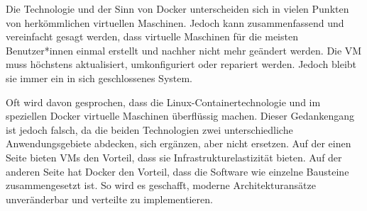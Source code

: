 
Die Technologie und der Sinn von Docker unterscheiden sich in vielen Punkten von herkömmlichen virtuellen Maschinen. Jedoch kann zusammenfassend und vereinfacht gesagt werden, dass virtuelle Maschinen für die meisten Benutzer*innen einmal erstellt und nachher nicht mehr geändert werden. Die VM muss höchstens aktualisiert, umkonfiguriert oder repariert werden. Jedoch bleibt sie immer ein in sich geschlossenes System. \cite{DockerVsVm}

Oft wird davon gesprochen, dass die Linux-Containertechnologie und im speziellen Docker virtuelle Maschinen überflüssig machen. Dieser Gedankengang ist jedoch falsch, da die beiden Technologien zwei unterschiedliche Anwendungsgebiete abdecken, sich ergänzen, aber nicht ersetzen. Auf der einen Seite bieten VMs den Vorteil, dass sie Infrastrukturelastizität bieten. Auf der anderen Seite hat Docker den Vorteil, dass die Software wie einzelne Bausteine zusammengesetzt ist. So wird es geschafft, moderne Architekturansätze unveränderbar und verteilte zu implementieren. \cite{DockerVsVm}
